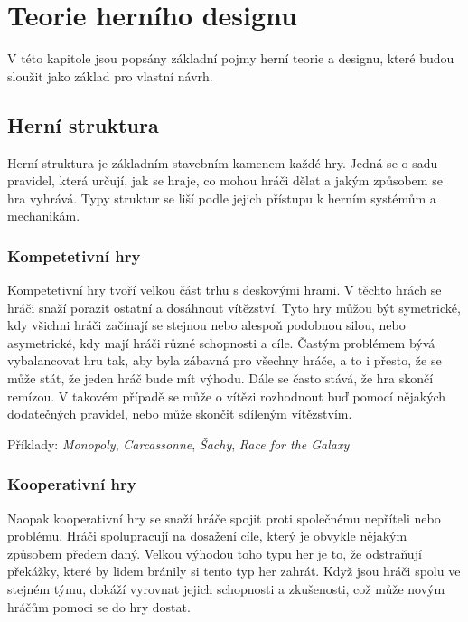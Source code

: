 \chapter{Teorie herního designu}
\label{chap:game_design}

V této kapitole jsou popsány základní pojmy herní teorie a designu, které budou sloužit jako základ pro vlastní návrh. \cite{building_blocks_of_tabletop_design_2022}



\section{Herní struktura}
\label{sec:structure}

Herní struktura je základním stavebním kamenem každé hry. Jedná se o sadu pravidel, která určují, jak se hraje, co mohou hráči dělat a jakým způsobem se hra vyhrává. Typy struktur se liší podle jejich přístupu k herním systémům a mechanikám. 

\subsection{Kompetetivní hry}
\label{subsec:structure_competitive}

Kompetetivní hry tvoří velkou část trhu s deskovými hrami. V těchto hrách se hráči snaží porazit ostatní a dosáhnout vítězství. Tyto hry můžou být symetrické, kdy všichni hráči začínají se stejnou nebo alespoň podobnou silou, nebo asymetrické, kdy mají hráči různé schopnosti a cíle. Častým problémem bývá vybalancovat hru tak, aby byla zábavná pro všechny hráče, a to i přesto, že se může stát, že jeden hráč bude mít výhodu. Dále se často stává, že hra skončí remízou. V takovém případě se může o vítězi rozhodnout buď pomocí nějakých dodatečných pravidel, nebo může skončit sdíleným vítězstvím.

Příklady: \textit{Monopoly}, \textit{Carcassonne}, \textit{Šachy}, \textit{Race for the Galaxy}

\subsection{Kooperativní hry}
\label{subsec:structure_cooperative}

Naopak kooperativní hry se snaží hráče spojit proti společnému nepříteli nebo problému. Hráči spolupracují na dosažení cíle, který je obvykle nějakým způsobem předem daný. Velkou výhodou toho typu her je to, že odstraňují překážky, které by lidem bránily si tento typ her zahrát. Když jsou hráči spolu ve stejném týmu, dokáží vyrovnat jejich schopnosti a zkušenosti, což může novým hráčům pomoci se do hry dostat.


